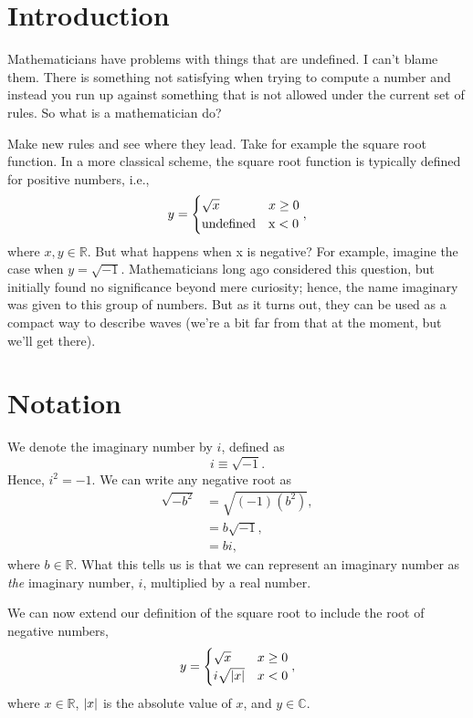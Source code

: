 \documentclass[final,a4paper,12pt]{article}
\theoremstyle{definition}
\begin{document}
\section{Introduction}
Mathematicians have problems with things that are undefined.  I can't blame them.
There is something not satisfying when trying to compute a number and instead
you run up against something that is not allowed under the current set of rules.
So what is a mathematician do?

Make new rules and see where they lead.  Take for example the square root
function.  In a more classical scheme, the square root function is
typically defined for positive numbers, i.e.,
\begin{equation*}
    y = \begin{cases}
        \sqrt{x} & x \geq 0 \\
        \text{undefined} & \text x < 0 \\
        \end{cases} ,
\end{equation*}
where $x, y \in \mathbb{R}$.  But what happens when x is negative?  For example,
imagine the case when $y = \sqrt{-1}$.  Mathematicians long ago considered this
question, but initially found no significance beyond mere curiosity; hence, the
name imaginary was given to this group of numbers.  But as it turns out, they
can be used as a compact way to describe waves (we're a bit far from that at the
moment, but we'll get there).

\section{Notation}
We denote the imaginary number by $i$, defined as
\begin{equation}
    i \equiv \sqrt{-1}.
\end{equation}
Hence, $i^2 = -1$.  We can write any negative root as
\begin{align*}
    \sqrt{-b^2} &= \sqrt{(-1)(b^2)}, \\
    &= b \sqrt{-1}, \\
    &= b i,
\end{align*}
where $b \in \mathbb{R}$.  What this tells us is that we can represent an
imaginary number as {\it the} imaginary number, $i$, multiplied by a real number.

We can now extend our definition of the square root to include the root of
negative numbers,
\begin{equation*}
    y = \begin{cases}
        \sqrt{x} & x \geq 0 \\
        i \sqrt{\abs{x}} & x < 0 \\
        \end{cases} ,
\end{equation*}
where $x \in \mathbb{R}$, $\abs{x}$ is the absolute value of $x$, and $y \in
\mathbb{C}$.
\end{document}
